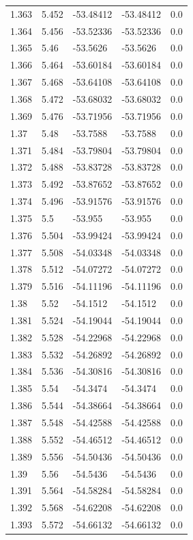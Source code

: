 \begin{tabular}{lllll}
1.363 & 5.452 & -53.48412 & -53.48412 & 0.0 \\
1.364 & 5.456 & -53.52336 & -53.52336 & 0.0 \\
1.365 & 5.46 & -53.5626 & -53.5626 & 0.0 \\
1.366 & 5.464 & -53.60184 & -53.60184 & 0.0 \\
1.367 & 5.468 & -53.64108 & -53.64108 & 0.0 \\
1.368 & 5.472 & -53.68032 & -53.68032 & 0.0 \\
1.369 & 5.476 & -53.71956 & -53.71956 & 0.0 \\
1.37 & 5.48 & -53.7588 & -53.7588 & 0.0 \\
1.371 & 5.484 & -53.79804 & -53.79804 & 0.0 \\
1.372 & 5.488 & -53.83728 & -53.83728 & 0.0 \\
1.373 & 5.492 & -53.87652 & -53.87652 & 0.0 \\
1.374 & 5.496 & -53.91576 & -53.91576 & 0.0 \\
1.375 & 5.5 & -53.955 & -53.955 & 0.0 \\
1.376 & 5.504 & -53.99424 & -53.99424 & 0.0 \\
1.377 & 5.508 & -54.03348 & -54.03348 & 0.0 \\
1.378 & 5.512 & -54.07272 & -54.07272 & 0.0 \\
1.379 & 5.516 & -54.11196 & -54.11196 & 0.0 \\
1.38 & 5.52 & -54.1512 & -54.1512 & 0.0 \\
1.381 & 5.524 & -54.19044 & -54.19044 & 0.0 \\
1.382 & 5.528 & -54.22968 & -54.22968 & 0.0 \\
1.383 & 5.532 & -54.26892 & -54.26892 & 0.0 \\
1.384 & 5.536 & -54.30816 & -54.30816 & 0.0 \\
1.385 & 5.54 & -54.3474 & -54.3474 & 0.0 \\
1.386 & 5.544 & -54.38664 & -54.38664 & 0.0 \\
1.387 & 5.548 & -54.42588 & -54.42588 & 0.0 \\
1.388 & 5.552 & -54.46512 & -54.46512 & 0.0 \\
1.389 & 5.556 & -54.50436 & -54.50436 & 0.0 \\
1.39 & 5.56 & -54.5436 & -54.5436 & 0.0 \\
1.391 & 5.564 & -54.58284 & -54.58284 & 0.0 \\
1.392 & 5.568 & -54.62208 & -54.62208 & 0.0 \\
1.393 & 5.572 & -54.66132 & -54.66132 & 0.0 \\

\end{tabular}
